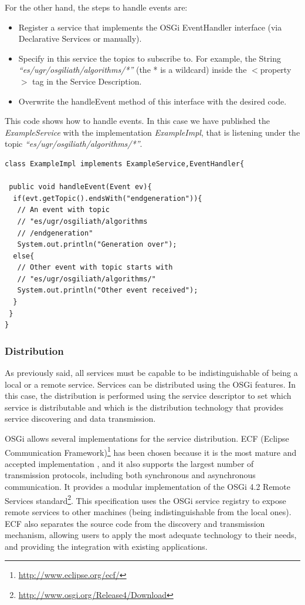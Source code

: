 For the other hand, the steps to handle events are:
\begin{itemize}
\item Register a service that implements the OSGi EventHandler interface (via Declarative Services or manually).
\item Specify in this service the topics to subscribe to. For example, the String {\em ``es/ugr/osgiliath/algorithms/*''} (the * is a wildcard) inside the $<$property$>$ tag in the Service Description.
\item Overwrite the handleEvent method of this interface with the desired code.
\end{itemize}

This code shows how to handle events. In this case we have published the {\em ExampleService} with the implementation {\em ExampleImpl}, that is listening under the topic {\em ``es/ugr/osgiliath/algorithms/*''}.

\begin{verbatim}
class ExampleImpl implements ExampleService,EventHandler{

 public void handleEvent(Event ev){
  if(evt.getTopic().endsWith("endgeneration")){
   // An event with topic 
   // "es/ugr/osgiliath/algorithms
   // /endgeneration"
   System.out.println("Generation over");
  else{
   // Other event with topic starts with
   // "es/ugr/osgiliath/algorithms/"
   System.out.println("Other event received");
  }
 }
}
\end{verbatim}


\subsubsection{Distribution}
As previously said, all services must be capable to be indistinguishable of being a local or a remote service. Services can be distributed using the OSGi features. In this case, the distribution is performed using the service descriptor to set which service is distributable and which is the distribution technology that provides service discovering and data transmission.

OSGi allows several implementations for the service distribution. ECF (Eclipse Communication Framework)\footnote{\url{http://www.eclipse.org/ecf/}} has been chosen because it is the most mature and accepted implementation \cite{petzold2011dynamic}, and it also supports the largest number of transmission protocols, including both synchronous and asynchronous communication. It provides a modular implementation of the OSGi 4.2 Remote Services standard\footnote{\url{http://www.osgi.org/Release4/Download}}. This specification uses the OSGi service registry to expose remote services to other machines (being indistinguishable from the local ones). ECF also separates the source code from the discovery and transmission mechanism, allowing users to apply the most adequate technology to their needs, and providing the integration with existing applications. %

